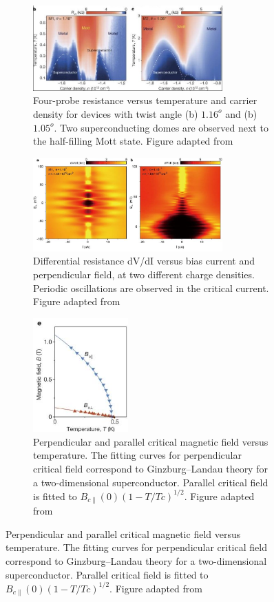 \begin{figure}[H]
	\begin{subfigure}{\linewidth}
		\centering
		\includegraphics[width=0.8\textwidth]{figures/sc.jpg}
		\caption{Four-probe resistance versus temperature and carrier density for devices with twist angle (b) $1.16^o$ and (b) $1.05^o$. Two superconducting domes are observed next to the half-filling Mott state. Figure adapted from \cite{Cao2018_2}}
		\label{fig:sc}
	\end{subfigure}
	\begin{subfigure}{\linewidth}
		\centering
		\includegraphics[width=0.8\textwidth]{figures/squid.jpg}
		\caption{Differential resistance dV/dI versus bias current and perpendicular field, at two different charge densities. Periodic oscillations are observed in the critical current. Figure adapted from \cite{Cao2018_2}}
		\label{fig:squid}
	\end{subfigure}
	\begin{subfigure}{\linewidth}
		\centering
		\includegraphics[width=0.4\textwidth]{figures/glt.jpg}
		\caption{Perpendicular and parallel critical magnetic field versus temperature. The fitting curves for perpendicular critical field correspond to Ginzburg–Landau theory for a two-dimensional superconductor. Parallel critical field is fitted to $B_{c\parallel}(0)(1-T/Tc)^{1/2}$. Figure adapted from \cite{Cao2018_2}}
		\label{fig:glt}
	\end{subfigure}
\end{figure}
